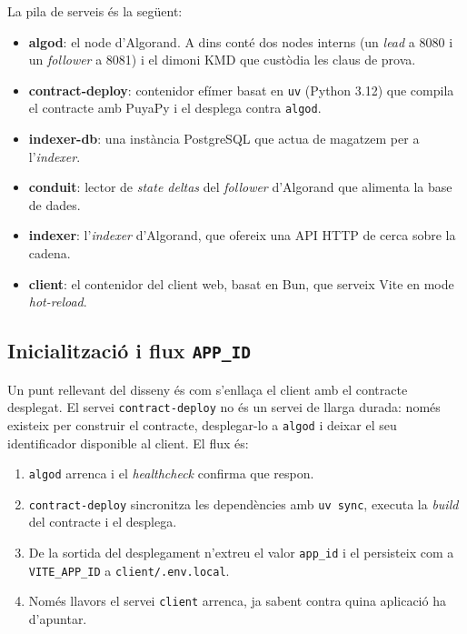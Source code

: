 La pila de serveis és la següent:

\begin{itemize}
    \item \textbf{algod}: el node d'Algorand. A dins conté dos nodes interns (un \textit{lead} a 8080 i un \textit{follower} a 8081) i el dimoni KMD que custòdia les claus de prova.
    \item \textbf{contract-deploy}: contenidor efímer basat en \texttt{uv} (Python 3.12) que compila el contracte amb PuyaPy i el desplega contra \texttt{algod}.
    \item \textbf{indexer-db}: una instància PostgreSQL que actua de magatzem per a l'\textit{indexer}.
    \item \textbf{conduit}: lector de \textit{state deltas} del \textit{follower} d'Algorand que alimenta la base de dades.
    \item \textbf{indexer}: l'\textit{indexer} d'Algorand, que ofereix una API HTTP de cerca sobre la cadena.
    \item \textbf{client}: el contenidor del client web, basat en Bun, que serveix Vite en mode \textit{hot-reload}.
\end{itemize}

\subsection{Inicialització i flux \texttt{APP\_ID}}

Un punt rellevant del disseny és com s'enllaça el client amb el contracte desplegat. El servei \texttt{contract-deploy} no és un servei de llarga durada: només existeix per construir el contracte, desplegar-lo a \texttt{algod} i deixar el seu identificador disponible al client. El flux és:

\begin{enumerate}
    \item \texttt{algod} arrenca i el \textit{healthcheck} confirma que respon.
    \item \texttt{contract-deploy} sincronitza les dependències amb \texttt{uv sync}, executa la \textit{build} del contracte i el desplega.
    \item De la sortida del desplegament n'extreu el valor \texttt{app\_id} i el persisteix com a \texttt{VITE\_APP\_ID} a \texttt{client/.env.local}.
    \item Només llavors el servei \texttt{client} arrenca, ja sabent contra quina aplicació ha d'apuntar.
\end{enumerate}

